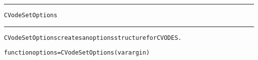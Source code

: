 \begin{samepage}
\hrule
\begin{center}
{\large \verb!CVodeSetOptions!}
\label{p:CVodeSetOptions}
\end{center}
\hrule\vspace{0.1in}



\begin{alltt}
CVodeSetOptions creates an options structure for CVODES.
\end{alltt}

\end{samepage}



\begin{samepage}


\begin{alltt}
function options = CVodeSetOptions(varargin) 
\end{alltt}

\end{samepage}




